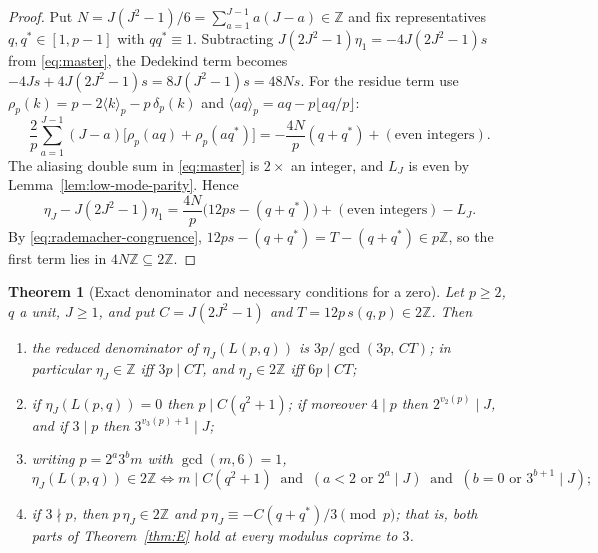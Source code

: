 \documentclass[11pt]{article}
\newtheorem{theorem}{Theorem}[section]
\theoremstyle{definition}
\newcommand{\Z}{\mathbb Z}
\begin{document}
\begin{proof}
Put $N=J(J^2-1)/6=\sum_{a=1}^{J-1}a(J-a)\in\Z$ and fix representatives
$q,q^*\in[1,p-1]$ with $qq^*\equiv1$.  Subtracting
$J(2J^2-1)\eta_1=-4J(2J^2-1)s$ from \eqref{eq:master}, the Dedekind term
becomes $-4Js+4J(2J^2-1)s=8J(J^2-1)s=48Ns$.  For the residue term use
$\rho_p(k)=p-2\langle k\rangle_p-p\,\delta_p(k)$ and
$\langle aq\rangle_p=aq-p\lfloor aq/p\rfloor$:
\[
 \frac2p\sum_{a=1}^{J-1}(J-a)\bigl[\rho_p(aq)+\rho_p(aq^*)\bigr]
 =-\frac{4N}p(q+q^*)+(\text{even integers}).
\]
The aliasing double sum in \eqref{eq:master} is $2\times$ an integer, and
$L_J$ is even by Lemma~\ref{lem:low-mode-parity}.  Hence
\[
 \eta_J-J(2J^2-1)\eta_1
 =\frac{4N}p\bigl(12ps-(q+q^*)\bigr)+(\text{even integers})-L_J .
\]
By \eqref{eq:rademacher-congruence}, $12ps-(q+q^*)=T-(q+q^*)\in p\Z$, so
the first term lies in $4N\Z\subseteq2\Z$.
\end{proof}

\begin{theorem}[Exact denominator and necessary conditions for a zero]
\label{thm:denominator}
Let $p\geq2$, $q$ a unit, $J\geq1$, and put $C=J(2J^2-1)$ and
$T=12p\,s(q,p)\in2\Z$.  Then
\begin{enumerate}[label=(\alph*)]
\item the reduced denominator of $\eta_J(L(p,q))$ is
$3p/\gcd(3p,\,CT)$; in particular $\eta_J\in\Z$ iff $3p\mid CT$, and
$\eta_J\in2\Z$ iff $6p\mid CT$;
\item if $\eta_J(L(p,q))=0$ then $p\mid C(q^2+1)$; if moreover $4\mid p$
then $2^{v_2(p)}\mid J$, and if $3\mid p$ then $3^{v_3(p)+1}\mid J$;
\item writing $p=2^a3^bm$ with $\gcd(m,6)=1$,
\[
 \eta_J(L(p,q))\in2\Z\iff
 m\mid C(q^2+1)\ \text{ and }\ (a<2\text{ or }2^a\mid J)\ \text{ and }\
 (b=0\text{ or }3^{b+1}\mid J);
\]
\item if $3\nmid p$, then $p\,\eta_J\in2\Z$ and
$p\,\eta_J\equiv-C(q+q^*)/3\pmod p$; that is, both parts of
Theorem~\ref{thm:E} hold at every modulus coprime to $3$.
\end{enumerate}
\end{theorem}
\end{document}
